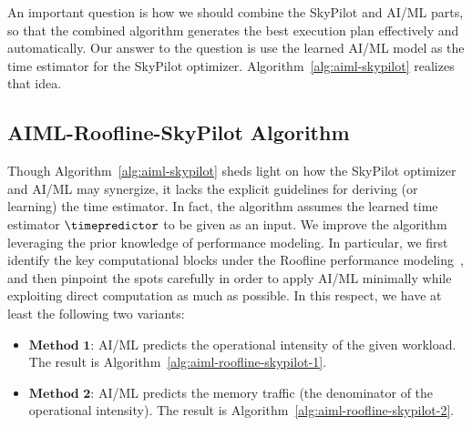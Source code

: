 \documentclass[runningheads]{llncs}
\begin{document}
An important question is how we should combine the SkyPilot and AI/ML parts, so that the combined algorithm generates the best execution plan effectively and automatically. Our answer to the question is use the learned AI/ML model as the time estimator for the SkyPilot optimizer. Algorithm~\ref{alg:aiml-skypilot} realizes that idea.

\subsection{AIML-Roofline-SkyPilot Algorithm}
Though Algorithm~\ref{alg:aiml-skypilot} sheds light on how the SkyPilot optimizer and AI/ML may synergize, it lacks the explicit guidelines for deriving (or learning) the time estimator. In fact, the algorithm assumes the learned time estimator $\timepredictor$ to be given as an input. We improve the algorithm leveraging the prior knowledge of performance modeling. In particular, we first identify the key computational blocks under the Roofline performance modeling~\cite{williams09roofline}, and then pinpoint the spots carefully in order to apply AI/ML minimally while exploiting direct computation as much as possible. In this respect, we have at least the following two variants:
\begin{itemize}
	\item $\textbf{Method 1:}$ AI/ML predicts the operational intensity of the given workload. The result is Algorithm~\ref{alg:aiml-roofline-skypilot-1}.
	\item $\textbf{Method 2:}$ AI/ML predicts the memory traffic (the denominator of the operational intensity). The result is Algorithm~\ref{alg:aiml-roofline-skypilot-2}.
\end{itemize}
\end{document}

